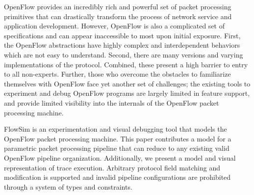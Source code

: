 
OpenFlow provides an incredibly rich and powerful set of packet processing 
primitives that can drastically transform the process of network service and 
application development. However, OpenFlow is also a complicated set of 
specifications and can appear inaccessible to most upon initial exposure. First,
the OpenFlow abstractions have highly complex and interdependent behaviors which
are not easy to understand. Second, there are many versions and varying
implementations of the protocol. Combined, these present a high barrier to entry
to all non-experts. Further, those who overcome the obstacles to familiarize
themselves with OpenFlow face yet another set of challenges; the existing tools
to experiment and debug OpenFlow programs are largely limited in feature 
support, and provide limited visibility into the internals of the OpenFlow 
packet processing machine.

FlowSim is an experimentation and visual debugging tool that models the OpenFlow
packet processing machine. This paper contributes a model for a parametric
packet processing pipeline that can reduce to any existing valid OpenFlow 
pipeline organization. Additionally, we present a model and visual 
representation of trace execution. Arbitrary protocol field matching and 
modification is supported and invalid pipeline configurations are prohibited 
through a system of types and constraints. 
